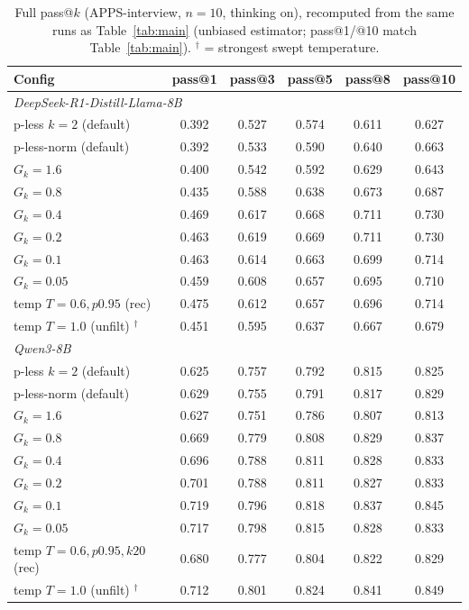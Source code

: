\documentclass[11pt]{article}                       %
\begin{document}
\begin{table}[H]\centering\small
\caption{Full pass@$k$ (APPS-interview, $n{=}10$, thinking on), recomputed from the same runs as
Table~\ref{tab:main} (unbiased estimator; pass@1/@10 match Table~\ref{tab:main}). $^\dagger$ = strongest
swept temperature.}
\label{tab:passk}
\begin{tabular}{lccccc}
\toprule
Config & pass@1 & pass@3 & pass@5 & pass@8 & pass@10 \\
\midrule
\multicolumn{6}{l}{\textit{DeepSeek-R1-Distill-Llama-8B}}\\
p-less $k{=}2$ (default) & 0.392 & 0.527 & 0.574 & 0.611 & 0.627 \\
p-less-norm (default) & 0.392 & 0.533 & 0.590 & 0.640 & 0.663 \\
$G_k{=}1.6$ & 0.400 & 0.542 & 0.592 & 0.629 & 0.643 \\
$G_k{=}0.8$ & 0.435 & 0.588 & 0.638 & 0.673 & 0.687 \\
$G_k{=}0.4$ & 0.469 & 0.617 & 0.668 & 0.711 & 0.730 \\
$G_k{=}0.2$ & 0.463 & 0.619 & 0.669 & 0.711 & 0.730 \\
$G_k{=}0.1$ & 0.463 & 0.614 & 0.663 & 0.699 & 0.714 \\
$G_k{=}0.05$ & 0.459 & 0.608 & 0.657 & 0.695 & 0.710 \\
temp $T{=}0.6,p0.95$ (rec) & 0.475 & 0.612 & 0.657 & 0.696 & 0.714 \\
temp $T{=}1.0$ (unfilt) $^\dagger$ & 0.451 & 0.595 & 0.637 & 0.667 & 0.679 \\
\midrule
\multicolumn{6}{l}{\textit{Qwen3-8B}}\\
p-less $k{=}2$ (default) & 0.625 & 0.757 & 0.792 & 0.815 & 0.825 \\
p-less-norm (default) & 0.629 & 0.755 & 0.791 & 0.817 & 0.829 \\
$G_k{=}1.6$ & 0.627 & 0.751 & 0.786 & 0.807 & 0.813 \\
$G_k{=}0.8$ & 0.669 & 0.779 & 0.808 & 0.829 & 0.837 \\
$G_k{=}0.4$ & 0.696 & 0.788 & 0.811 & 0.828 & 0.833 \\
$G_k{=}0.2$ & 0.701 & 0.788 & 0.811 & 0.827 & 0.833 \\
$G_k{=}0.1$ & 0.719 & 0.796 & 0.818 & 0.837 & 0.845 \\
$G_k{=}0.05$ & 0.717 & 0.798 & 0.815 & 0.828 & 0.833 \\
temp $T{=}0.6,p0.95,k20$ (rec) & 0.680 & 0.777 & 0.804 & 0.822 & 0.829 \\
temp $T{=}1.0$ (unfilt) $^\dagger$ & 0.712 & 0.801 & 0.824 & 0.841 & 0.849 \\
\bottomrule
\end{tabular}
\end{table}
\end{document}
